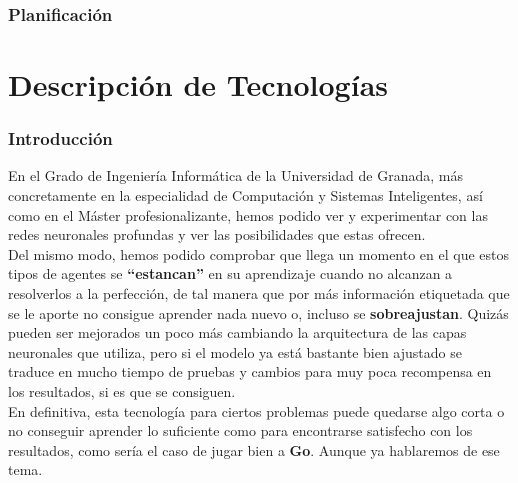 \documentclass[11pt,fleqn]{book} %
\begin{document}
\section{Planificación}\label{sec:planificacion}



\part{Descripción de Tecnologías}

\section*{Introducción}

En el Grado de Ingeniería Informática de la Universidad de Granada, más concretamente en la especialidad de Computación y Sistemas Inteligentes, así como en el Máster profesionalizante, hemos podido ver y experimentar con las redes neuronales profundas y ver las posibilidades que estas ofrecen. \\

Del mismo modo, hemos podido comprobar que llega un momento en el que estos tipos de agentes se \textbf{``estancan''} en su aprendizaje cuando no alcanzan a resolverlos a la perfección, de tal manera que por más información etiquetada que se le aporte no consigue aprender nada nuevo o, incluso se \textbf{sobreajustan}. Quizás pueden ser mejorados un poco más cambiando la arquitectura de las capas neuronales que utiliza, pero si el modelo ya está bastante bien ajustado se traduce en mucho tiempo de pruebas y cambios para muy poca recompensa en los resultados, si es que se consiguen. \\

En definitiva, esta tecnología para ciertos problemas puede quedarse algo corta o no conseguir aprender lo suficiente como para encontrarse satisfecho con los resultados, como sería el caso de jugar bien a \textbf{Go}. Aunque ya hablaremos de ese tema.\cite{article:go} \\
\end{document}
